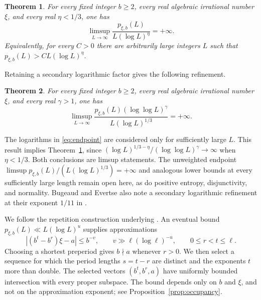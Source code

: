 \documentclass[11pt]{article}
\numberwithin{equation}{section}
\newtheorem{theorem}{Theorem}[section]
\theoremstyle{remark}
\begin{document}
\begin{theorem}\label{thm:main}
For every fixed integer $b\ge2$, every real algebraic irrational number
$\xi$, and every real $\eta<1/3$, one has
\begin{equation}\label{eq:main}
 \limsup_{L\to\infty}
 \frac{p_{\xi,b}(L)}{L(\log L)^\eta}=+\infty.
\end{equation}
Equivalently, for every $C>0$ there are arbitrarily large integers $L$
such that $p_{\xi,b}(L)>CL(\log L)^\eta$.
\end{theorem}

Retaining a secondary logarithmic factor gives the following refinement.

\begin{theorem}\label{thm:endpoint}
For every fixed integer $b\ge2$, every real algebraic irrational number
$\xi$, and every real $\gamma>1$, one has
\begin{equation}\label{eq:endpoint}
 \limsup_{L\to\infty}
 \frac{p_{\xi,b}(L)(\log\log L)^\gamma}
      {L(\log L)^{1/3}}=+\infty.
\end{equation}
\end{theorem}

The logarithms in \eqref{eq:endpoint} are considered only for sufficiently
large $L$. This result implies Theorem~\ref{thm:main}, since
$(\log L)^{1/3-\eta}/(\log\log L)^\gamma\to\infty$ when $\eta<1/3$.
Both conclusions are limsup statements. The unweighted endpoint
$\limsup p_{\xi,b}(L)/(L(\log L)^{1/3})=+\infty$ and analogous lower
bounds at every sufficiently large length remain open here, as do
positive entropy, disjunctivity, and normality.
Bugeaud and Evertse also note a secondary logarithmic refinement at
their exponent $1/11$ in \cite[equation (2.4)]{BE08}.

We follow the repetition construction underlying \cite[\S6]{BE08}.
An eventual bound $p_{\xi,b}(L)\ll L(\log L)^u$ supplies approximations
\[
 |(b^t-b^r)\xi-a|\le b^{-v},\qquad
 v\gg \ell(\log\ell)^{-u},\qquad 0\le r<t\le\ell.
\]
Choosing a shortest preperiod gives $b\nmid a$ whenever $r>0$.
We then select a sequence for which the period lengths $s=t-r$
are distinct and the exponents $t$ more than double.
The selected vectors $(b^t,b^r,a)$ have uniformly bounded intersection
with every proper subspace. The bound depends only on $b$ and $\xi$,
and not on the approximation exponent; see Proposition~\ref{prop:occupancy}.
\end{document}
